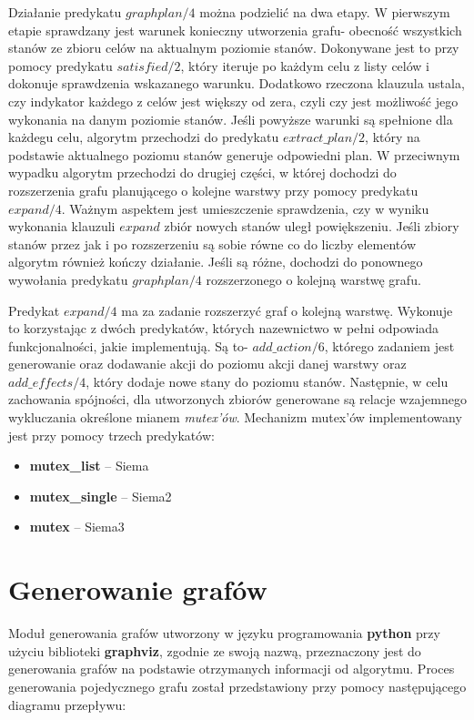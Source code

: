     Działanie predykatu $graphplan/4$ można podzielić na dwa etapy. W pierwszym etapie sprawdzany jest warunek konieczny utworzenia grafu- 
    obecność wszystkich stanów ze zbioru celów na aktualnym poziomie stanów. Dokonywane jest to przy pomocy predykatu $satisfied/2$, który 
    iteruje po każdym celu z listy celów i dokonuje sprawdzenia wskazanego warunku. Dodatkowo rzeczona klauzula ustala, czy indykator każdego z 
    celów jest większy od zera, czyli czy jest możliwość jego wykonania na danym poziomie stanów. Jeśli powyższe warunki są spełnione dla każdegu celu, 
    algorytm przechodzi do predykatu $extract\_plan/2$, który na podstawie aktualnego poziomu stanów generuje odpowiedni plan. W przeciwnym wypadku 
    algorytm przechodzi do drugiej części, w której dochodzi do rozszerzenia grafu planującego o kolejne warstwy przy pomocy predykatu $expand/4$. 
    Ważnym aspektem jest umieszczenie sprawdzenia, czy w wyniku wykonania klauzuli $expand$ zbiór nowych stanów uległ powiększeniu. Jeśli zbiory stanów 
    przez jak i po rozszerzeniu są sobie równe co do liczby elementów algorytm również kończy działanie. Jeśli są różne, dochodzi do ponownego wywołania 
    predykatu $graphplan/4$ rozszerzonego o kolejną warstwę grafu.

    
    Predykat $expand/4$ ma za zadanie rozszerzyć graf o kolejną warstwę. Wykonuje to korzystając z dwóch predykatów, których nazewnictwo w pełni 
    odpowiada funkcjonalności, jakie implementują. Są to- $add\_action/6$, którego zadaniem jest generowanie oraz dodawanie akcji do poziomu akcji 
    danej warstwy oraz $add\_effects/4$, który dodaje nowe stany do poziomu stanów. Następnie, w celu zachowania spójności, dla utworzonych zbiorów 
    generowane są relacje wzajemnego wykluczania określone mianem \textit{mutex'ów}. Mechanizm mutex'ów implementowany jest przy pomocy trzech predykatów:
    \begin{itemize}
        \item \textbf{mutex\_list} -- Siema
        \item \textbf{mutex\_single} -- Siema2 
        \item \textbf{mutex} -- Siema3
    \end{itemize}


\section{Generowanie grafów}
    Moduł generowania grafów utworzony w języku programowania \textbf{python} przy użyciu biblioteki \textbf{graphviz}, zgodnie ze swoją nazwą,
    przeznaczony jest do generowania grafów na podstawie otrzymanych informacji od algorytmu. Proces generowania pojedycznego grafu został przedstawiony 
    przy pomocy następującego diagramu przepływu:

